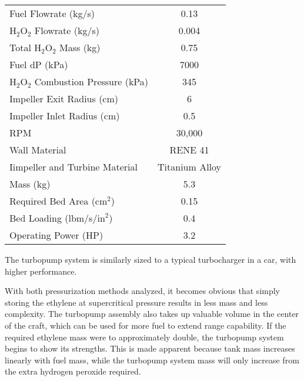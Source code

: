 \begin{center}
\begin{tabular}{l  c}
Fuel Flowrate (kg/s) & 0.13 \\
$\text{H}_2\text{O}_2$ Flowrate (kg/s) & 0.004 \\
Total $\text{H}_2\text{O}_2$ Mass (kg) & 0.75 \\
Fuel dP (kPa) & 7000 \\
$\text{H}_2\text{O}_2$ Combustion Pressure (kPa) & 345 \\
Impeller Exit Radius (cm) & 6 \\
Impeller Inlet Radius (cm) & 0.5 \\
RPM & 30,000 \\
Wall Material & RENE 41 \\
Iimpeller and Turbine Material & Titanium Alloy \\
Mass (kg) & 5.3 \\
Required Bed Area ($\text{cm}^2$) & 0.15 \\
Bed Loading (lbm/s/$\text{in}^2$) & 0.4 \\
Operating Power (HP) & 3.2
\end{tabular}
\label{tab:turboParams}
\end{center}

The turbopump system is similarly sized to a typical turbocharger in a car, with higher performance. 

With both pressurization methods analyzed, it becomes obvious that simply storing the ethylene at supercritical pressure results in less mass and less complexity. The turbopump assembly also takes up valuable volume in the center of the craft, which can be used for more fuel to extend range capability. If the required ethylene mass were to approximately double, the turbopump system begins to show its strengths. This is made apparent because tank mass increases linearly with fuel mass, while the turbopump system mass will only increase from the extra hydrogen peroxide required. 
 

